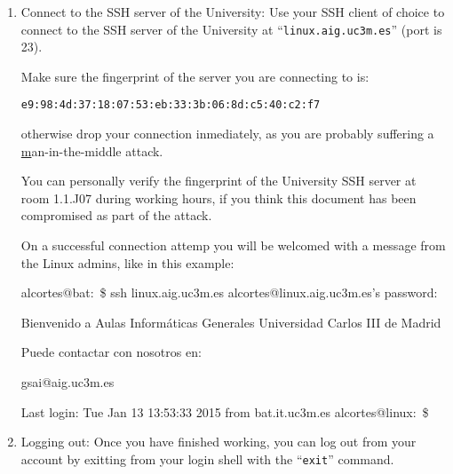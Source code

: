 \documentclass[a4paper, 12pt]{article}
\begin{document}
\begin{enumerate}
\begin{enumerate}
      If you are using Linux or Mac, there is a great chance you
      already have an SSH client installed in your computer, the program is
      called ``\texttt{ssh}''. If this program is not already installed, just
      install it.

    \item Connect to the SSH server of the University: Use your SSH client of
      choice to connect to the SSH server of the University at
      ``\texttt{linux.aig.uc3m.es}'' (port is 23).

      Make sure the fingerprint of the server you are connecting to is:

      \begin{center}
        \texttt{e9:98:4d:37:18:07:53:eb:33:3b:06:8d:c5:40:c2:f7}
      \end{center}

      otherwise drop your connection inmediately, as you are probably suffering
      a
      \href{http://en.wikipedia.org/wiki/Man-in-the-middle_attackman-in-the-middle}
      man-in-the-middle attack.

      You can personally verify the fingerprint of the University SSH server at
      room 1.1.J07 during working hours, if you think this document has been
      compromised as part of the attack.

      On a successful connection attemp you will be
      welcomed with a message from the Linux admins, like in this example:

\begin{blackboard}
alcortes@bat:~\$ ssh linux.aig.uc3m.es
alcortes@linux.aig.uc3m.es's password: 

       Bienvenido a Aulas Informáticas Generales
          Universidad Carlos III de Madrid

          Puede contactar con nosotros en:
     
                gsai@aig.uc3m.es

Last login: Tue Jan 13 13:53:33 2015 from bat.it.uc3m.es
alcortes@linux:~\$
\end{blackboard}

    \item Logging out: Once you have finished working, you can log out from
      your account by exitting from your login shell with the ``\texttt{exit}''
      command.

  \end{enumerate}

\end{enumerate}
\end{document}
